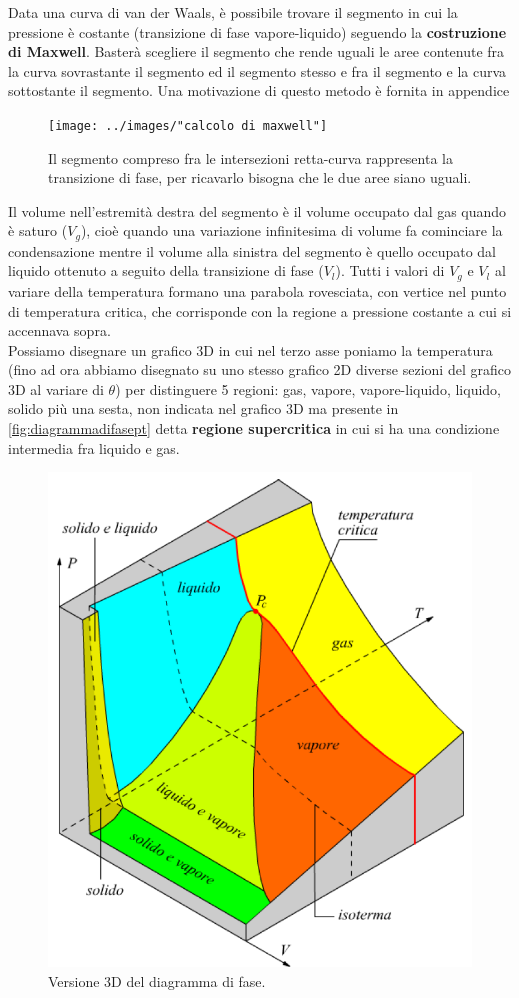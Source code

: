 \documentclass[
10pt, %
a4paper, %
oneside, %
headinclude,footinclude, %
BCOR5mm, %
]{scrartcl}
\begin{document}
\FloatBarrier
Data una curva di van der Waals, è possibile trovare il segmento in cui la pressione è costante (transizione di fase vapore-liquido) seguendo la \textbf{costruzione di Maxwell}. Basterà scegliere il segmento che rende uguali le aree contenute fra la curva sovrastante il segmento ed il segmento stesso e fra il segmento e la curva sottostante il segmento. Una motivazione di questo metodo è fornita in appendice
\begin{figure}
	\centering
	\texttt{[image: ../images/"calcolo di maxwell"]}
	\caption{Il segmento compreso fra le intersezioni retta-curva rappresenta la transizione di fase, per ricavarlo bisogna che le due aree siano uguali.}
	\label{fig:calcolo-di-maxwell}
\end{figure}
\FloatBarrier 
Il volume nell'estremità destra del segmento è il volume occupato dal gas quando è saturo ($V_g$), cioè quando una variazione infinitesima di volume fa cominciare la condensazione mentre il volume alla sinistra del segmento è quello occupato dal liquido ottenuto a seguito della transizione di fase ($V_l$). Tutti i valori di $V_g$ e $V_l$ al variare della temperatura formano una parabola rovesciata, con vertice nel punto di temperatura critica, che corrisponde con la regione a pressione costante a cui si accennava sopra. \\
Possiamo disegnare un grafico 3D in cui nel terzo asse poniamo la temperatura (fino ad ora abbiamo disegnato su uno stesso grafico 2D diverse sezioni del grafico 3D al variare di $\theta$) per distinguere 5 regioni: gas, vapore, vapore-liquido, liquido, solido più una sesta, non indicata nel grafico 3D ma presente in \ref{fig:diagrammadifasept} detta \textbf{regione supercritica} in cui si ha una condizione intermedia fra liquido e gas.  
\begin{figure}[h!]
	\centering
	\includegraphics[width=0.5\linewidth]{../images/diagrammadifase3D}
	\caption{Versione 3D del diagramma di fase.}
	\label{fig:diagrammadifase3d}
\end{figure}
\FloatBarrier
\end{document}
